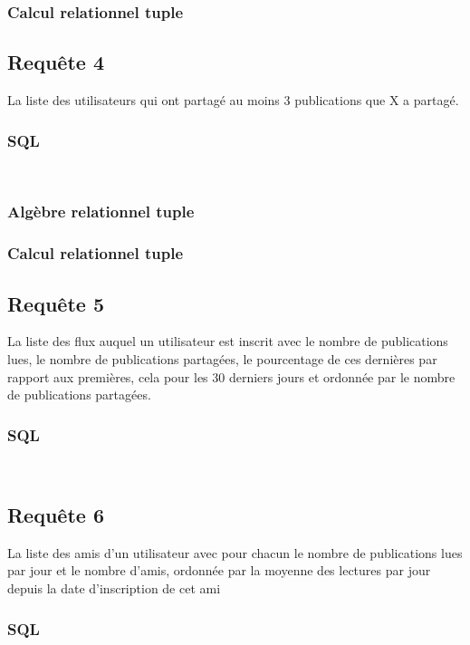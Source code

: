 \documentclass[a4paper,10pt]{article}
\begin{document}
\subsubsection{Calcul relationnel tuple}
\clearpage
\subsection{Requête 4}
La liste des utilisateurs qui ont partagé au moins 3 publications que X a partagé.
\subsubsection{SQL}
\begin{lstlisting}


\end{lstlisting}
\subsubsection{Algèbre relationnel tuple}

\subsubsection{Calcul relationnel tuple}
\clearpage
\subsection{Requête 5}
La liste des flux auquel un utilisateur est inscrit avec le nombre de publications lues, le nombre de publications
partagées, le pourcentage de ces dernières par rapport aux premières, cela pour les 30 derniers jours et ordonnée
par le nombre de publications partagées.
\subsubsection{SQL}
\begin{lstlisting}


\end{lstlisting}
\subsection{Requête 6}
La liste des amis d’un utilisateur avec pour chacun le nombre de publications lues par jour et le nombre
d’amis, ordonnée par la moyenne des lectures par jour depuis la date d’inscription de cet ami

\subsubsection{SQL}
\begin{lstlisting}


\end{lstlisting}
\end{document}
